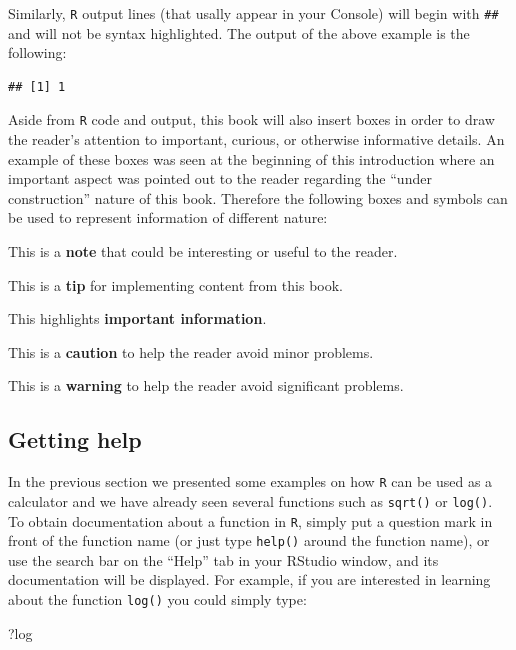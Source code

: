 \documentclass[12pt,]{krantz}
\newenvironment{Shaded}{\begin{snugshade}}{\end{snugshade}}
\newcommand{\NormalTok}[1]{#1}
\let\BeginKnitrBlock\begin \let\EndKnitrBlock\end
\begin{document}
Similarly, \texttt{R} output lines (that usally appear in your Console)
will begin with \texttt{\#\#} and will not be syntax highlighted. The
output of the above example is the following:

\begin{verbatim}
## [1] 1
\end{verbatim}

Aside from \texttt{R} code and output, this book will also insert boxes
in order to draw the reader's attention to important, curious, or
otherwise informative details. An example of these boxes was seen at the
beginning of this introduction where an important aspect was pointed out
to the reader regarding the ``under construction'' nature of this book.
Therefore the following boxes and symbols can be used to represent
information of different nature:

\BeginKnitrBlock{rmdnote}
This is a \textbf{note} that could be interesting or useful to the
reader.
\EndKnitrBlock{rmdnote}

\BeginKnitrBlock{rmdtip}
This is a \textbf{tip} for implementing content from this book.
\EndKnitrBlock{rmdtip}

\BeginKnitrBlock{rmdimportant}
This highlights \textbf{important information}.
\EndKnitrBlock{rmdimportant}

\BeginKnitrBlock{rmdcaution}
This is a \textbf{caution} to help the reader avoid minor problems.
\EndKnitrBlock{rmdcaution}

\BeginKnitrBlock{rmdwarning}
This is a \textbf{warning} to help the reader avoid significant
problems.
\EndKnitrBlock{rmdwarning}

\subsection{Getting help}\label{getting-help}

In the previous section we presented some examples on how \texttt{R} can
be used as a calculator and we have already seen several functions such
as \texttt{sqrt()} or \texttt{log()}. To obtain documentation about a
function in \texttt{R}, simply put a question mark in front of the
function name (or just type \texttt{help()} around the function name),
or use the search bar on the ``Help'' tab in your RStudio window, and
its documentation will be displayed. For example, if you are interested
in learning about the function \texttt{log()} you could simply type:

\begin{Shaded}
\begin{Highlighting}[]
\NormalTok{?log}
\end{Highlighting}
\end{Shaded}
\end{document}
